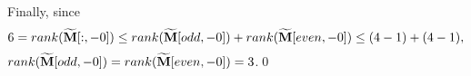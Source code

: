 Finally, since $$6 = rank(\widetilde{\mathbf{M}}[:,-0]) \leq rank(\widetilde{\mathbf{M}}[odd,-0]) + rank(\widetilde{\mathbf{M}}[even,-0]) \leq (4-1) + (4-1),$$ $rank(\widetilde{\mathbf{M}}[odd,-0]) = rank(\widetilde{\mathbf{M}}[even,-0]) = 3$.\qed
\begin{comment}
By Lemma \ref{lem: M-symmetry}, $\M[:,-0]$ are the same at $\V{\omega},\V{\omega}+\V{\pi}_2,\V{\omega}+\V{\pi}_4$ and $\V{\omega} + \V{\pi}_6$ up to row permutations. Therefore, the columns of the matrix $\V{B}$ below should be in $col\big(\M[:,-0](\V{\omega})\big)$,
\begin{align*}
\V{B}&= \widetilde{\mathbf{m}_0}^\uparrow\otimes\mathbf{m}_0 - [\V{b}_0,\V{b}_2,\V{b}_4,\V{b}_6]\\
&\doteq
\begin{bmatrix}
 \overline{\widetilde{m_0}}(\V{\omega})\\
 0\\
\sbarmp{0}{2}\\
0\\
\sbarmp{0}{4}\\
0\\
\sbarmp{0}{6}\\
0
\end{bmatrix}
\otimes
\begin{bmatrix}
 m_0(\V{\omega})\\
 m_0(\V{\omega} + \V{\pi}_2)\\
 m_0(\V{\omega} + \V{\pi}_4)\\
 m_0(\V{\omega} + \V{\pi}_6) 
\end{bmatrix}
-
\begin{bmatrix}
1 & 0 & 0 & 0\\
0 & 0 & 0 & 0\\
0 & 1 & 0 & 0\\
0 & 0 & 0 & 0\\
0 & 0 & 1 & 0\\
0 & 0 & 0 & 0\\
0 & 0 & 0 & 1\\
0 & 0 & 0 & 0
\end{bmatrix},
\end{align*}


\end{comment}

